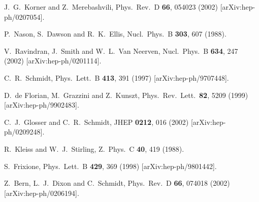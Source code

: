 \documentclass[12pt]{article}
\begin{document}
\begin{thebibliography}{99}
  J.~G.~Korner and Z.~Merebashvili,
  Phys.\ Rev.\  D {\bf 66}, 054023 (2002)
  [arXiv:hep-ph/0207054].

P.~Nason, S.~Dawson and R.~K.~Ellis,
Nucl.\ Phys.\ B {\bf 303}, 607 (1988).

V.~Ravindran, J.~Smith and W.~L.~Van Neerven,
Nucl.\ Phys.\ B {\bf 634}, 247 (2002)
[arXiv:hep-ph/0201114].

C.~R.~Schmidt,
Phys.\ Lett.\ B {\bf 413}, 391 (1997)
[arXiv:hep-ph/9707448].

D.~de Florian, M.~Grazzini and Z.~Kunszt,
Phys.\ Rev.\ Lett.\  {\bf 82}, 5209 (1999)
[arXiv:hep-ph/9902483].

C.~J.~Glosser and C.~R.~Schmidt,
JHEP {\bf 0212}, 016 (2002)
[arXiv:hep-ph/0209248].

R.~Kleiss and W.~J.~Stirling,
Z.\ Phys.\ C {\bf 40}, 419 (1988).

  S.~Frixione,
  Phys.\ Lett.\  B {\bf 429}, 369 (1998)
  [arXiv:hep-ph/9801442].

  Z.~Bern, L.~J.~Dixon and C.~Schmidt,
  Phys.\ Rev.\  D {\bf 66}, 074018 (2002)
  [arXiv:hep-ph/0206194].


\end{thebibliography}
\end{document}
